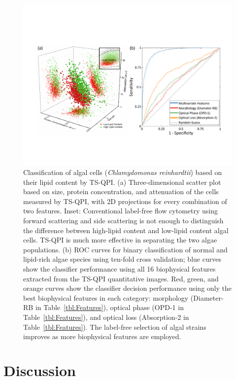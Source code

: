 \documentclass[aps,pra,reprint,superscriptaddress]{revtex4-1}
\begin{document}
\begin{figure}
\includegraphics[scale=0.7]{FigureAlgae.pdf}
\caption{\label{fig:AlgaeScatter} Classification of algal cells (\textit{Chlamydomonas reinhardtii}) based on their lipid content by TS-QPI. (a) Three-dimensional scatter plot based on size, protein concentration, and attenuation of the cells measured by TS-QPI, with 2D projections for every combination of two features. Inset: Conventional label-free flow cytometry using forward scattering and side scattering is not enough to distinguish the difference between high-lipid content and low-lipid content algal cells. TS-QPI is much more effective in separating the two algae populations. (b) ROC curves for binary classification of normal and lipid-rich algae species using ten-fold cross validation; blue curves show the classifier performance using all 16 biophysical features extracted from the TS-QPI quantitative images. Red, green, and orange curves show the classifier decision performance using only the best biophysical features in each category: morphology (Diameter-RB in Table~\ref{tbl:Features}), optical phase (OPD-1 in Table~\ref{tbl:Features}), and optical loss (Absorption-2 in Table~\ref{tbl:Features}). The label-free selection of algal strains improves as more biophysical features are employed.}
\end{figure}

\section*{Discussion}
\end{document}

